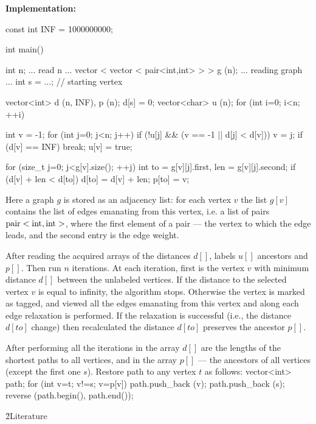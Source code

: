 \bf{Implementation}:

\code
const int INF = 1000000000;

int main() {
int n;
... read n ...
vector < vector < pair<int,int> > > g (n);
... reading graph ...
int s = ...; // starting vertex

vector<int> d (n, INF), p (n);
d[s] = 0;
vector<char> u (n);
for (int i=0; i<n; ++i) {
int v = -1;
for (int j=0; j<n; j++)
if (!u[j] && (v == -1 || d[j] < d[v]))
v = j;
if (d[v] == INF)
break;
u[v] = true;

for (size_t j=0; j<g[v].size(); ++j) {
int to = g[v][j].first,
len = g[v][j].second;
if (d[v] + len < d[to]) {
d[to] = d[v] + len;
p[to] = v;
}
}
}
}
\endcode

Here a graph $g$ is stored as an adjacency list: for each vertex $v$ the list $g[v]$ contains the list of edges emanating from this vertex, i.e. a list of pairs $\rm pair<int,int>$, where the first element of a pair --- the vertex to which the edge leads, and the second entry is the edge weight.

After reading the acquired arrays of the distances $d[]$, labels $u[]$ ancestors and $p[]$. Then run $n$ iterations. At each iteration, first is the vertex $v$ with minimum distance $d[]$ between the unlabeled vertices. If the distance to the selected vertex $v$ is equal to infinity, the algorithm stops. Otherwise the vertex is marked as tagged, and viewed all the edges emanating from this vertex and along each edge relaxation is performed. If the relaxation is successful (i.e., the distance $d[to]$ change) then recalculated the distance $d[to]$ preserves the ancestor $p[]$.

After performing all the iterations in the array $d[]$ are the lengths of the shortest paths to all vertices, and in the array $p[]$ --- the ancestors of all vertices (except the first one $s$). Restore path to any vertex $t$ as follows:
\code
vector<int> path;
for (int v=t; v!=s; v=p[v])
path.push_back (v);
path.push_back (s);
reverse (path.begin(), path.end());
\endcode

\h2{Literature}

\ul{
\li {}
\li {}
}